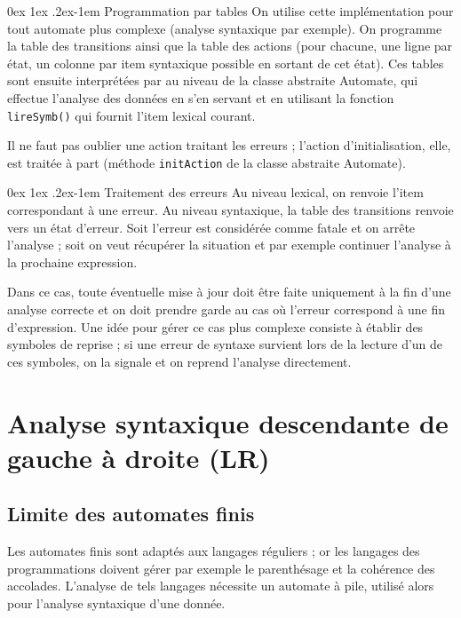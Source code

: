 \documentclass[a4paper]{article}
\makeatletter
\renewcommand{\paragraph}{%
  \@startsection{paragraph}{4}%
  {\z@}{0ex \@plus 1ex \@minus .2ex}{-1em}%
  {\normalfont\normalsize\bfseries}%
}
\makeatother
\begin{document}
\paragraph{Programmation par tables} On utilise cette implémentation pour tout automate plus complexe (analyse syntaxique par exemple). On programme la table des transitions ainsi que la table des actions (pour chacune, une ligne par état, un colonne par item syntaxique possible en sortant de cet état). Ces tables sont ensuite interprétées par au niveau de la classe abstraite Automate, qui effectue l'analyse des données en s'en servant et en utilisant la fonction \verb?lireSymb()? qui fournit l'item lexical courant.

Il ne faut pas oublier une action traitant les erreurs ; l'action d'initialisation, elle, est traitée à part (méthode \verb?initAction? de la classe abstraite Automate).

\paragraph{Traitement des erreurs} Au niveau lexical, on renvoie l'item correspondant à une erreur. Au niveau syntaxique, la table des transitions renvoie vers un état d'erreur. Soit l'erreur est considérée comme fatale et on arrête l'analyse ; soit on veut récupérer la situation et par exemple continuer l'analyse à la prochaine expression.

Dans ce cas, toute éventuelle mise à jour doit être faite uniquement à la fin d'une analyse correcte et on doit prendre garde au cas où l'erreur correspond à une fin d'expression. Une idée pour gérer ce cas plus complexe consiste à établir des symboles de reprise ; si une erreur de syntaxe survient lors de la lecture d'un de ces symboles, on la signale et on reprend l'analyse directement.

\section{Analyse syntaxique descendante de gauche à droite (LR)}

\subsection{Limite des automates finis}

Les automates finis sont adaptés aux langages réguliers ; or les langages des programmations doivent gérer par exemple le parenthésage et la cohérence des accolades. L'analyse de tels langages nécessite un automate à pile, utilisé alors pour l'analyse syntaxique d'une donnée.
\end{document}
